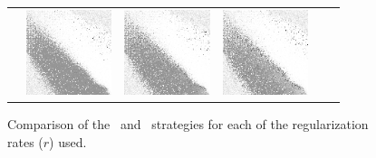 \begin{figure}
\begin{tabular}{l l p{2.75cm} p{2.75cm} p{2.75cm} p{2.75cm}}
		&\parbox[c]{1em}{\includegraphics[width=2.5cm]{images/findings/experiments/regularization/strats/0.60/hand_max_avg.png}}
		&\parbox[c]{1em}{\includegraphics[width=2.5cm]{images/findings/experiments/regularization/strats/0.70/hand_max_avg.png}}
		&\parbox[c]{1em}{\includegraphics[width=2.5cm]{images/findings/experiments/regularization/strats/0.80/hand_max_avg.png}}
\end{tabular}

\caption{
	Comparison of the \handmaxmin\ and \handmaxavg\ strategies
	for each of the regularization rates ($r$) used.
}
\label{fig:expts-reg-comp}
\end{figure}

